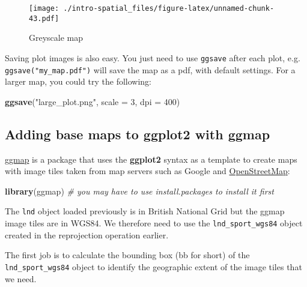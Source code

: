 \documentclass[]{article}
\newenvironment{Shaded}{}{}
\newcommand{\KeywordTok}[1]{\textcolor[rgb]{0.00,0.44,0.13}{\textbf{{#1}}}}
\newcommand{\DataTypeTok}[1]{\textcolor[rgb]{0.56,0.13,0.00}{{#1}}}
\newcommand{\DecValTok}[1]{\textcolor[rgb]{0.25,0.63,0.44}{{#1}}}
\newcommand{\StringTok}[1]{\textcolor[rgb]{0.25,0.44,0.63}{{#1}}}
\newcommand{\CommentTok}[1]{\textcolor[rgb]{0.38,0.63,0.69}{\textit{{#1}}}}
\newcommand{\NormalTok}[1]{{#1}}
\begin{document}
\begin{figure}[htbp]
\centering
\texttt{[image: ./intro-spatial\_files/figure-latex/unnamed-chunk-43.pdf]}
\caption{Greyscale map}
\end{figure}

Saving plot images is also easy. You just need to use \texttt{ggsave}
after each plot, e.g. \texttt{ggsave("my\_map.pdf")} will save the map
as a pdf, with default settings. For a larger map, you could try the
following:

\begin{Shaded}
\begin{Highlighting}[]
\KeywordTok{ggsave}\NormalTok{(}\StringTok{"large_plot.png"}\NormalTok{, }\DataTypeTok{scale =} \DecValTok{3}\NormalTok{, }\DataTypeTok{dpi =} \DecValTok{400}\NormalTok{)}
\end{Highlighting}
\end{Shaded}

\subsection{Adding base maps to ggplot2 with
ggmap}\label{adding-base-maps-to-ggplot2-with-ggmap}

\href{http://journal.r-project.org/archive/2013-1/kahle-wickham.pdf}{ggmap}
is a package that uses the \textbf{ggplot2} syntax as a template to
create maps with image tiles taken from map servers such as Google and
\href{http://www.openstreetmap.org/}{OpenStreetMap}:

\begin{Shaded}
\begin{Highlighting}[]
\KeywordTok{library}\NormalTok{(ggmap) }\CommentTok{# you may have to use install.packages to install it first}
\end{Highlighting}
\end{Shaded}

The \texttt{lnd} object loaded previously is in British National Grid
but the ggmap image tiles are in WGS84. We therefore need to use the
\texttt{lnd\_sport\_wgs84} object created in the reprojection operation
earlier.

The first job is to calculate the bounding box (bb for short) of the
\texttt{lnd\_sport\_wgs84} object to identify the geographic extent of
the image tiles that we need.
\end{document}

